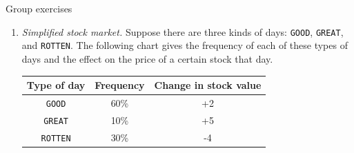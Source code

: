 \documentclass[10pt]{beamer}
\begin{document}
\begin{frame}{Group exercises}
\footnotesize 
\begin{enumerate}
	\item \textit{Simplified stock market.} Suppose there are three kinds of days: \texttt{GOOD}, \texttt{GREAT}, and \texttt{ROTTEN}. The following chart gives the frequency of each of these types of days and the effect on the price of a certain stock that day.
	
	\begin{table}[H]
	\begin{tabular}{|c|c|c|}
	\toprule 
	\colorbox{blue!30}{Type of day} & 	\colorbox{blue!30}{Frequency} & \colorbox{blue!30}{Change in stock value} \\
	\midrule 
	\texttt{GOOD} & 60\% & +2 \\
	\texttt{GREAT} & 10\% & +5 \\
	\texttt{ROTTEN} & 30\% & -4 \\
	\bottomrule 
	\end{tabular}
	\end{table}
	

\end{enumerate}
\end{frame}
\end{document}
